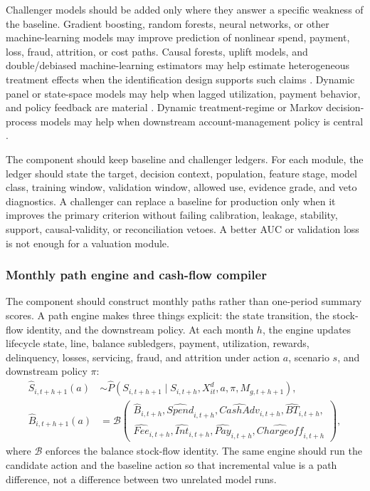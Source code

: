 \documentclass[11pt]{article}
\newcommand{\1}{\mathbf{1}}
\begin{document}
Challenger models should be added only where they answer a specific weakness
of the baseline. Gradient boosting, random forests, neural networks, or other
machine-learning models may improve prediction of nonlinear spend, payment,
loss, fraud, attrition, or cost paths. Causal forests, uplift models, and
double/debiased machine-learning estimators may help estimate heterogeneous
treatment effects when the identification design supports such claims
\citep{wager2018causalforests,chernozhukov2018dml}. Dynamic panel or
state-space models may help when lagged utilization, payment behavior, and
policy feedback are material \citep{arellano1991panel,blundell1998initial}.
Dynamic treatment-regime or Markov decision-process models may help when
downstream account-management policy is central
\citep{murphy2003dynamic,puterman1994mdp}.

The component should keep baseline and challenger ledgers. For each module,
the ledger should state the target, decision context, population, feature
stage, model class, training window, validation window, allowed use, evidence
grade, and veto diagnostics. A challenger can replace a baseline for
production only when it improves the primary criterion without failing
calibration, leakage, stability, support, causal-validity, or reconciliation
vetoes. A better AUC or validation loss is not enough for a valuation module.

\subsubsection{Monthly path engine and cash-flow compiler}
\label{subsec:path-engine}

The component should construct monthly paths rather than one-period summary
scores. A path engine makes three things explicit: the state transition, the
stock-flow identity, and the downstream policy. At each month $h$, the engine
updates lifecycle state, line, balance subledgers, payment, utilization,
rewards, delinquency, losses, servicing, fraud, and attrition under action
$a$, scenario $s$, and downstream policy $\pi$:
\begin{align}
  \widehat{S}_{i,t+h+1}(a)
  &\sim
  \widehat{P}(
    S_{i,t+h+1}\mid S_{i,t+h},X_{it}^{d},a,\pi,M_{g,t+h+1}), \\
  \widehat{B}_{i,t+h+1}(a)
  &=
  \mathcal{B}\!\left(
    \begin{array}{l}
    \widehat{B}_{i,t+h},\widehat{Spend}_{i,t+h},
    \widehat{CashAdv}_{i,t+h},\widehat{BT}_{i,t+h},\\
    \widehat{Fee}_{i,t+h},\widehat{Int}_{i,t+h},
    \widehat{Pay}_{i,t+h},\widehat{Chargeoff}_{i,t+h}
    \end{array}
  \right),
  \label{eq:path-engine-balance}
\end{align}
where $\mathcal{B}$ enforces the balance stock-flow identity. The same engine
should run the candidate action and the baseline action so that incremental
value is a path difference, not a difference between two unrelated model runs.
\end{document}
